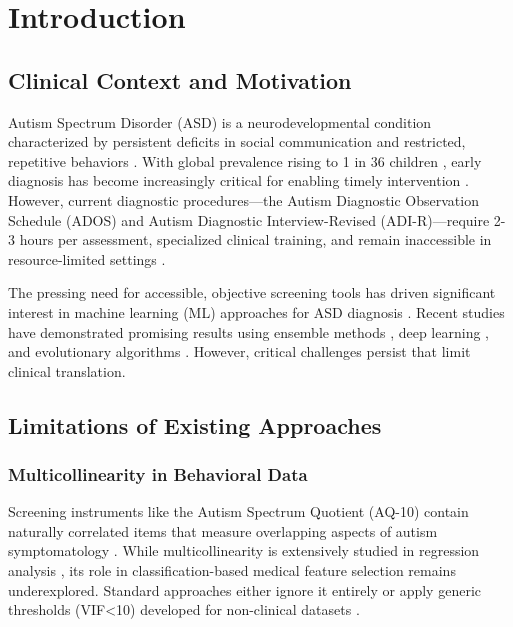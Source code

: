 \section{Introduction}\label{introduction}

\subsection{Clinical Context and Motivation}\label{clinical-context-and-motivation}

Autism Spectrum Disorder (ASD) is a neurodevelopmental condition characterized by persistent deficits in social communication and restricted, repetitive behaviors \cite{ref1}. With global prevalence rising to 1 in 36 children \cite{ref2}, early diagnosis has become increasingly critical for enabling timely intervention \cite{ref3}. However, current diagnostic procedures---the Autism Diagnostic Observation Schedule (ADOS) and Autism Diagnostic Interview-Revised (ADI-R)---require 2-3 hours per assessment, specialized clinical training, and remain inaccessible in resource-limited settings \cite{ref4}.

The pressing need for accessible, objective screening tools has driven significant interest in machine learning (ML) approaches for ASD diagnosis \cite{ref5,ref6,ref7,ref8,ref9}. Recent studies have demonstrated promising results using ensemble methods \cite{ref10}, deep learning \cite{ref11}, and evolutionary algorithms \cite{ref12}. However, critical challenges persist that limit clinical translation.

\subsection{Limitations of Existing Approaches}\label{limitations-of-existing-approaches-1}

\subsubsection{Multicollinearity in Behavioral Data}

Screening instruments like the Autism Spectrum Quotient (AQ-10) contain naturally correlated items that measure overlapping aspects of autism symptomatology \cite{ref13}. While multicollinearity is extensively studied in regression analysis \cite{ref14}, its role in classification-based medical feature selection remains underexplored. Standard approaches either ignore it entirely or apply generic thresholds (VIF\textless10) developed for non-clinical datasets \cite{ref15}.

